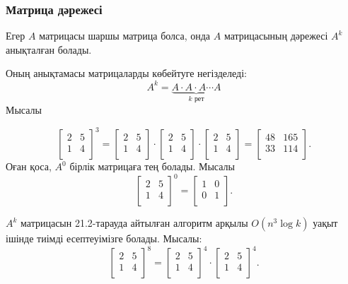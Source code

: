 \subsubsection{Матрица дәрежесі}


Егер $A$ матрицасы шаршы матрица болса, онда $A$ матрицасының дәрежесі $A^k$ анықталған болады.
 
Оның анықтамасы матрицаларды көбейтуге негізделеді:
\[ A^k = \underbrace{A \cdot A \cdot A \cdots A}_{\textrm{$k$ рет}} \]
Мысалы

\[
 \begin{bmatrix}
  2 & 5 \\
  1 & 4 \\
 \end{bmatrix}^3 =
 \begin{bmatrix}
  2 & 5 \\
  1 & 4 \\
 \end{bmatrix} \cdot
 \begin{bmatrix}
  2 & 5 \\
  1 & 4 \\
 \end{bmatrix} \cdot
 \begin{bmatrix}
  2 & 5 \\
  1 & 4 \\
 \end{bmatrix} =
 \begin{bmatrix}
  48 & 165 \\
  33 & 114 \\
 \end{bmatrix}.
\]
Оған қоса, $A^0$ бірлік матрицаға тең болады. Мысалы
\[
 \begin{bmatrix}
  2 & 5 \\
  1 & 4 \\
 \end{bmatrix}^0 =
 \begin{bmatrix}
  1 & 0 \\
  0 & 1 \\
 \end{bmatrix}.
\]

$A^k$ матрицасын 21.2-тарауда айтылған алгоритм арқылы
$O(n^3 \log k)$ уақыт ішінде
тиімді есептеуімізге болады. Мысалы:
\[
 \begin{bmatrix}
  2 & 5 \\
  1 & 4 \\
 \end{bmatrix}^8 =
 \begin{bmatrix}
  2 & 5 \\
  1 & 4 \\
 \end{bmatrix}^4 \cdot
 \begin{bmatrix}
  2 & 5 \\
  1 & 4 \\
 \end{bmatrix}^4.
\]

